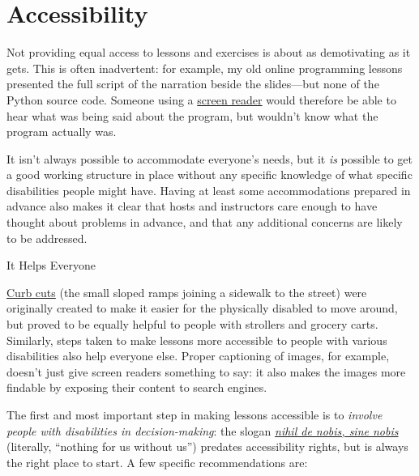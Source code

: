 \section{Accessibility}\label{s:motivation-accessibility}

Not providing equal access to lessons and exercises is about as
demotivating as it gets. This is often inadvertent: for example, my
old online programming lessons presented the full script of the
narration beside the slides---but none of the Python source code.
Someone using a
\href{https://en.wikipedia.org/wiki/Screen_reader}{screen reader}
would therefore be able to hear what was being said about the program,
but wouldn't know what the program actually was.

It isn't always possible to accommodate everyone's needs, but it
\emph{is} possible to get a good working structure in place without
any specific knowledge of what specific disabilities people might
have.  Having at least some accommodations prepared in advance also
makes it clear that hosts and instructors care enough to have thought
about problems in advance, and that any additional concerns are likely
to be addressed.

\begin{callout}{It Helps Everyone}

  \href{https://en.wikipedia.org/wiki/Curb_cut}{Curb cuts} (the small
  sloped ramps joining a sidewalk to the street) were originally
  created to make it easier for the physically disabled to move
  around, but proved to be equally helpful to people with strollers
  and grocery carts.  Similarly, steps taken to make lessons more
  accessible to people with various disabilities also help everyone
  else. Proper captioning of images, for example, doesn't just give
  screen readers something to say: it also makes the images more
  findable by exposing their content to search engines.

\end{callout}

The first and most important step in making lessons accessible is to
\emph{involve people with disabilities in decision-making}: the slogan
\emph{\href{https://en.wikipedia.org/wiki/Nothing_About_Us_Without_Us}{nihil
    de nobis, sine nobis}} (literally, ``nothing for us without us'')
predates accessibility rights, but is always the right place to
start. A few specific recommendations are:

